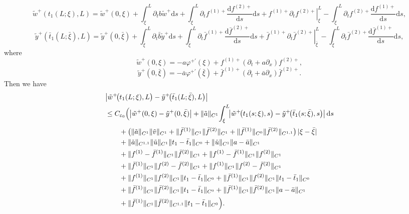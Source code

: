 \documentclass[a4paper,reqno,11pt]{amsart}
\numberwithin{equation}{section} %
\begin{document}
$$
\tilde{w}^+\left( t_1(L;\xi ),L \right) =\tilde{w}^+(0,\xi )+\int_{\xi}^L{\partial _tb\tilde{w}^+\mathrm{d}s}+\int_{\xi}^L{\partial _tf^{(1)+}\frac{\mathrm{d}f^{(2)+}}{\mathrm{d}s}\mathrm{d}s}+\left. f^{(1)+}\partial _tf^{(2)+} \right|_{\xi}^{L}-\int_{\xi}^L{\partial _tf^{(2)+}\frac{\mathrm{d}f^{(1)+}}{\mathrm{d}s}\mathrm{d}s,}
$$
$$
\tilde{y}^+\left( \bar{t}_1(L;\bar{\xi}),L \right) =\tilde{y}^+(0,\bar{\xi})+\int_{\bar{\xi}}^L{\partial _t\bar{b}\tilde{y}^+\mathrm{d}s}+\int_{\bar{\xi}}^L{\partial _t\bar{f}^{(1)+}\frac{\mathrm{d}\bar{f}^{(2)+}}{\mathrm{d}s}\mathrm{d}s}+\left. \bar{f}^{(1)+}\partial _t\bar{f}^{(2)+} \right|_{\bar{\xi}}^{L}-\int_{\bar{\xi}}^L{\partial _t\bar{f}^{(2)+}\frac{\mathrm{d}\bar{f}^{(1)+}}{\mathrm{d}s}\mathrm{d}s,}
$$
where 
$$
\tilde{w}^+(0,\xi )=-a\varphi ^{+\prime}(\xi )+f^{(1)+}\left( \partial _t+a\partial _x \right) f^{(2)+},
$$
$$
\tilde{y}^+(0,\bar{\xi})=-\bar{a}\varphi ^{+\prime}(\bar{\xi})+\bar{f}^{(1)+}\left( \partial _t+\bar{a}\partial _x \right) \bar{f}^{(2)+}.
$$
Then we have
$$
\begin{aligned}
&\bigl|\tilde w^+\!\bigl(t_1(L;\xi),L\bigr)-\tilde y ^+\!\bigl(\bar t_1(L;\bar\xi),L\bigr)\bigr|
\\
&\le C_{\varepsilon_0}\Bigl(
   \bigl|\tilde w^+(0,\xi)-\tilde y ^+(0,\bar\xi)\bigr|
   + \|\tilde a\|_{C^{1}}\!\int_{\xi}^{L}\!\bigl|\tilde w^+\!\bigl(t_1(s;\xi),s\bigr)-\tilde y ^+\!\bigl(\bar t_1(s;\bar\xi),s\bigr)\bigr|\,\mathrm{d}s
\\[2pt]
&\qquad
   + \bigl(\|\tilde a\|_{C^{1}}\|\tilde v\|_{C^{1}}
     + \|\bar f^{(1)}\|_{C^{1}}\|\bar f^{(2)}\|_{C^{1}}
     + \|\bar f^{(1)}\|_{C^{0}}\|\bar f^{(2)}\|_{C^{1,1}}\bigr)\,|\xi-\bar\xi|
\\
&\qquad
   + \|\tilde a\|_{C^{1,1}}\|\tilde u\|_{C^{1}}\|t_1-\bar t_1\|_{C^{0}}
   + \|\tilde u\|_{C^{1}}\|a-\bar a\|_{C^{1}}
\\
&\qquad
   + \|f^{(1)}-\bar f^{(1)}\|_{C^{1}}\|\bar f^{(2)}\|_{C^{1}}
   + \|f^{(1)}-\bar f^{(1)}\|_{C^{1}}\|f^{(2)}\|_{C^{1}}
\\
&\qquad
   + \|\bar f^{(1)}\|_{C^{1}}\|f^{(2)}-\bar f^{(2)}\|_{C^{1}}
   + \|f^{(1)}\|_{C^{1}}\|f^{(2)}-\bar f^{(2)}\|_{C^{1}}
\\
&\qquad
   + \|f^{(1)}\|_{C^{1}}\|f^{(2)}\|_{C^{1}}\|t_1-\bar t_1\|_{C^{0}}
   + \|\bar f^{(1)}\|_{C^{1}}\|f^{(2)}\|_{C^{1}}\|t_1-\bar t_1\|_{C^{0}}
\\
&\qquad
   + \|\bar f^{(1)}\|_{C^{1}}\|\bar f^{(2)}\|_{C^{1}}\|t_1-\bar t_1\|_{C^{0}}
   + \|\bar f^{(1)}\|_{C^{1}}\|\bar f^{(2)}\|_{C^{1}}\|a-\bar a\|_{C^{1}}
\\
&\qquad
   + \|\bar f^{(1)}\|_{C^{1}}\|\bar f^{(2)}\|_{C^{1,1}}\|t_1-\bar t_1\|_{C^{0}}
\Bigr).
\end{aligned}
$$
\end{document}
